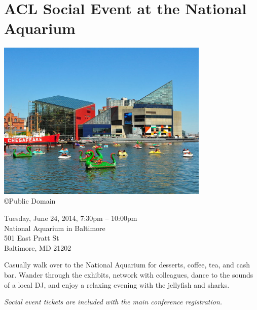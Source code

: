 \clearpage
\section[Social Event at the National Aquarium]{ACL Social Event at the National Aquarium}

\begin{center}

\includegraphics[width=4in]{content/tuesday/aqua.jpg} \\

{\tiny \copyright Public Domain}

Tuesday, June 24, 2014, 7:30pm -- 10:00pm \vspace{1em}\\
National Aquarium in Baltimore\\
501 East Pratt St\\
Baltimore, MD 21202
\end{center}

\noindent Casually walk over to the National Aquarium for desserts,
coffee, tea, and cash bar. Wander through the exhibits, network with
colleagues, dance to the sounds of a local DJ, and enjoy a relaxing
evening with the jellyfish and sharks.

\noindent \emph{Social event tickets are included with the main
  conference registration.}

